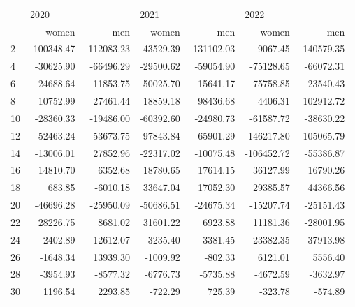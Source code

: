 \begin{tabular}{lrrrrrr}
\toprule
{} & \multicolumn{2}{l}{2020} & \multicolumn{2}{l}{2021} & \multicolumn{2}{l}{2022} \\
{} &      women &        men &     women &        men &      women &        men \\
\midrule
2  & -100348.47 & -112083.23 & -43529.39 & -131102.03 &   -9067.45 & -140579.35 \\
4  &  -30625.90 &  -66496.29 & -29500.62 &  -59054.90 &  -75128.65 &  -66072.31 \\
6  &   24688.64 &   11853.75 &  50025.70 &   15641.17 &   75758.85 &   23540.43 \\
8  &   10752.99 &   27461.44 &  18859.18 &   98436.68 &    4406.31 &  102912.72 \\
10 &  -28360.33 &  -19486.00 & -60392.60 &  -24980.73 &  -61587.72 &  -38630.22 \\
12 &  -52463.24 &  -53673.75 & -97843.84 &  -65901.29 & -146217.80 & -105065.79 \\
14 &  -13006.01 &   27852.96 & -22317.02 &  -10075.48 & -106452.72 &  -55386.87 \\
16 &   14810.70 &    6352.68 &  18780.65 &   17614.15 &   36127.99 &   16790.26 \\
18 &     683.85 &   -6010.18 &  33647.04 &   17052.30 &   29385.57 &   44366.56 \\
20 &  -46696.28 &  -25950.09 & -50686.51 &  -24675.34 &  -15207.74 &  -25151.43 \\
22 &   28226.75 &    8681.02 &  31601.22 &    6923.88 &   11181.36 &  -28001.95 \\
24 &   -2402.89 &   12612.07 &  -3235.40 &    3381.45 &   23382.35 &   37913.98 \\
26 &   -1648.34 &   13939.30 &  -1009.92 &    -802.33 &    6121.01 &    5556.40 \\
28 &   -3954.93 &   -8577.32 &  -6776.73 &   -5735.88 &   -4672.59 &   -3632.97 \\
30 &    1196.54 &    2293.85 &   -722.29 &     725.39 &    -323.78 &    -574.89 \\
\bottomrule
\end{tabular}
